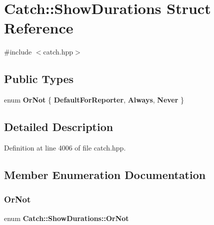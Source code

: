 \section{Catch\+::Show\+Durations Struct Reference}
\label{struct_catch_1_1_show_durations}


{\ttfamily \#include $<$catch.\+hpp$>$}

\subsection*{Public Types}
\begin{DoxyCompactItemize}
\item 
enum \textbf{ Or\+Not} \{ \textbf{ Default\+For\+Reporter}, 
\textbf{ Always}, 
\textbf{ Never}
 \}
\end{DoxyCompactItemize}


\subsection{Detailed Description}


Definition at line 4006 of file catch.\+hpp.



\subsection{Member Enumeration Documentation}
\mbox{\label{struct_catch_1_1_show_durations_a82fa0174554187220c1eda175f122ee1}} 
\subsubsection{OrNot}
{\footnotesize\ttfamily enum \textbf{ Catch\+::\+Show\+Durations\+::\+Or\+Not}}

